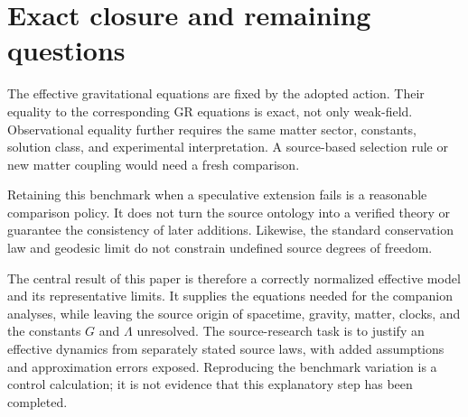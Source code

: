 \documentclass[11pt]{article}
\begin{document}
\section{Exact closure and remaining questions}
The effective gravitational equations are fixed by the adopted action. Their equality to the corresponding GR equations is exact, not only weak-field. Observational equality further requires the same matter sector, constants, solution class, and experimental interpretation. A source-based selection rule or new matter coupling would need a fresh comparison.

Retaining this benchmark when a speculative extension fails is a reasonable comparison policy. It does not turn the source ontology into a verified theory or guarantee the consistency of later additions. Likewise, the standard conservation law and geodesic limit do not constrain undefined source degrees of freedom.

The central result of this paper is therefore a correctly normalized effective model and its representative limits. It supplies the equations needed for the companion analyses, while leaving the source origin of spacetime, gravity, matter, clocks, and the constants $G$ and $\Lambda$ unresolved.
The source-research task is to justify an effective dynamics from separately stated source laws, with added assumptions and approximation errors exposed. Reproducing the benchmark variation is a control calculation; it is not evidence that this explanatory step has been completed.

\References
\end{document}
